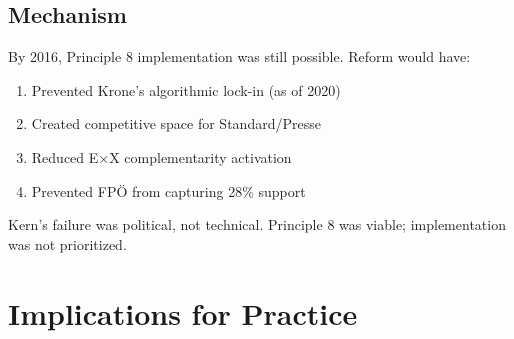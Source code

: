 \subsection{Mechanism}

By 2016, Principle 8 implementation was still possible. Reform would have:
\begin{enumerate}
\item Prevented Krone's algorithmic lock-in (as of 2020)
\item Created competitive space for Standard/Presse
\item Reduced E×X complementarity activation
\item Prevented FPÖ from capturing 28\% support
\end{enumerate}

Kern's failure was political, not technical. Principle 8 was viable; implementation was not prioritized.


\section{Implications for Practice}
\label{sec:bf-practice}

